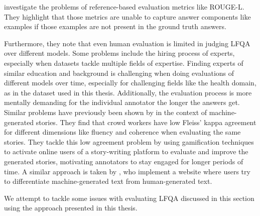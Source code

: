 \cite{krishna:2021:Hurdles} investigate the problems of reference-based evaluation metrics like ROUGE-L. 
They highlight that those metrics are unable to capture answer components like examples if those examples are not present in the ground truth answers. 

Furthermore, they note that even human evaluation is limited in judging LFQA over different models.
Some problems include the hiring process of experts, especially when datasets tackle multiple fields of expertise.
Finding experts of similar education and background is challenging when doing evaluations of different models over time, especially for challenging fields like the health domain, as in the dataset used in this thesis.
Additionally, the evaluation process is more mentally demanding for the individual annotator the longer the answers get.
Similar problems have previously been shown by \cite{akoury:2020:Storium} in the context of machine-generated stories.
They find that crowd workers have low Fleiss' kappa agreement for different dimensions like fluency and coherence when evaluating the same stories.
They tackle this low agreement problem by using gamification techniques to activate online users of a story-writing platform to evaluate and improve the generated stories, motivating annotators to stay engaged for longer periods of time.
A similar approach is taken by \cite{dugan:2020:RoFT}, who implement a website where users try to differentiate machine-generated text from human-generated text.

We attempt to tackle some issues with evaluating LFQA discussed in this section using the approach presented in this thesis.

